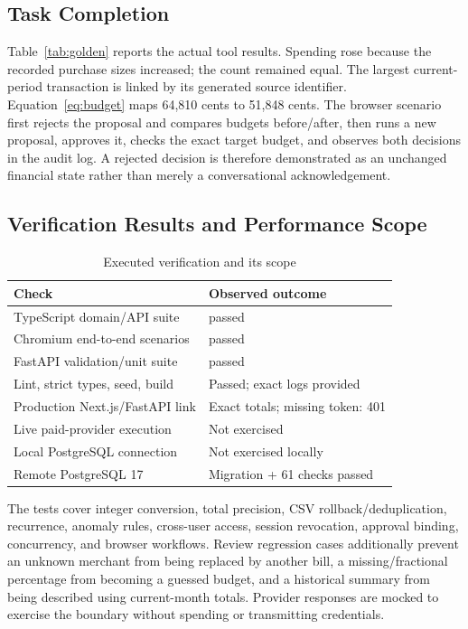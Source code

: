 \documentclass[conference,a4paper]{IEEEtran}
\begin{document}
\subsection{Task Completion}
Table~\ref{tab:golden} reports the actual tool results. Spending rose because the recorded purchase sizes increased; the count remained equal. The largest current-period transaction is linked by its generated source identifier. Equation~\eqref{eq:budget} maps 64,810 cents to 51,848 cents. The browser scenario first rejects the proposal and compares budgets before/after, then runs a new proposal, approves it, checks the exact target budget, and observes both decisions in the audit log. A rejected decision is therefore demonstrated as an unchanged financial state rather than merely a conversational acknowledgement.

\subsection{Verification Results and Performance Scope}
\begin{table}[t]
\caption{Executed verification and its scope}
\centering\small
\begin{tabular}{L{43mm}L{36mm}}
\toprule Check & Observed outcome\\\midrule
TypeScript domain/API suite & \UnitTests{} passed\\
Chromium end-to-end scenarios & \BrowserTests{} passed\\
FastAPI validation/unit suite & \PythonTests{} passed\\
Lint, strict types, seed, build & Passed; exact logs provided\\
Production Next.js/FastAPI link & Exact totals; missing token: 401\\
Live paid-provider execution & Not exercised\\
Local PostgreSQL connection & Not exercised locally\\
Remote PostgreSQL 17 & Migration + 61 checks passed\\
\bottomrule
\end{tabular}
\label{tab:verification}
\end{table}

The tests cover integer conversion, total precision, CSV rollback/deduplication, recurrence, anomaly rules, cross-user access, session revocation, approval binding, concurrency, and browser workflows. Review regression cases additionally prevent an unknown merchant from being replaced by another bill, a missing/fractional percentage from becoming a guessed budget, and a historical summary from being described using current-month totals. Provider responses are mocked to exercise the boundary without spending or transmitting credentials.
\end{document}
